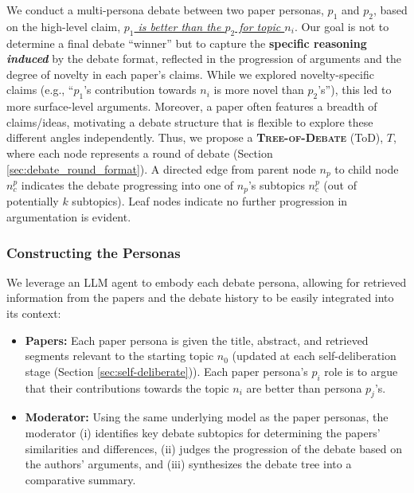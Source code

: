 \par We conduct a multi-persona debate between two paper personas, $p_1$ and $p_2$, based on the high-level claim, \textit{\underline{$p_1$ is better than the $p_2$ for topic $n_i$}}. Our goal is not to determine a final debate ``winner'' but to capture the \textbf{specific reasoning} \textbf{\textit{induced}} by the debate format, reflected in the progression of arguments and the degree of novelty in each paper’s claims. While we explored novelty-specific claims (e.g., ``$p_1$’s contribution towards $n_i$ is more novel than $p_2$’s''), this led to more surface-level arguments. Moreover, a paper often features a breadth of claims/ideas, motivating a debate structure that is flexible to explore these different angles independently. Thus, we propose a \textbf{\textsc{Tree-of-Debate}} (ToD), $T$, where each node represents a round of debate (Section \ref{sec:debate_round_format}). A directed edge from parent node $n_p$ to child node $n^p_c$ indicates the debate progressing into one of $n_p$'s subtopics $n^p_c$ (out of potentially $k$ subtopics). Leaf nodes indicate no further progression in argumentation is evident.

\subsubsection{Constructing the Personas} We leverage an LLM agent to embody each debate persona, allowing for retrieved information from the papers and the debate history to be easily integrated into its context:
\begin{itemize}[leftmargin=*]
    \item \textbf{Papers:} Each paper persona is given the title, abstract, and retrieved segments relevant to the starting topic $n_0$ (updated at each self-deliberation stage (Section \ref{sec:self-deliberate})). Each paper persona's $p_i$ role is to argue that their contributions towards the topic $n_i$ are better than persona $p_j$'s.
    \item \textbf{Moderator:} Using the same underlying model as the paper personas, the moderator (i) identifies key debate subtopics for determining the papers' similarities and differences, (ii) judges the progression of the debate based on the authors' arguments, and (iii) synthesizes the debate tree into a comparative summary.
\end{itemize}

